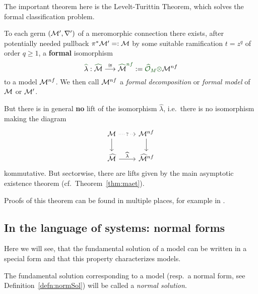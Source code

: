 The important theorem here is the Levelt-Turittin Theorem, which solves the
formal classification problem.
\begin{thm}\label{thm:leveltTurittin}
  To each germ $(\mathcal{M}',\nabla')$ of a meromorphic connection there exists, after
  potentially needed pullback $\pi^{*}\textcolor{black}{\mathcal{M}'}=:\mathcal{M}$ by some
  suitable ramification $t=z^q$ of order $q\geq1$, a
  \textcolor{green!30!black}{\textbf{formal}} isomorphism
  \[
    \textcolor{green!30!black}{\hat{\textcolor{black}{\lambda}}}:
    \textcolor{green!30!black}{\hat{\textcolor{black}{\cM}}}
    \overset{\cong}\longrightarrow
    \textcolor{green!30!black}{\hat{\textcolor{black}{\cM}}^{nf}}
    :=\textcolor{green!30!black}{\hat\cO_M\otimes}\cM^{nf}
  \]
  to a model $\mathcal{M}^{nf}$.
  We then call $\mathcal{M}^{nf}$ a \emph{formal decomposition} or \emph{formal model}
  of $\mathcal{M}$ or $\mathcal{M}'$.
  \begin{rem}
    But there is in general \textbf{no} lift of the isomorphism $\hat\lambda$,
    i.e.\ there is no isomorphism making the diagram
    \[ \begin{tikzcd}
        \cM \dar \arrow[dotted]{r}[description]{?} & \cM^{nf} \dar
        \\\hat\cM \rar{\hat\lambda} & \hat\cM^{nf}
    \end{tikzcd} \]
    kommutative.
    But sectorwise, there are lifts given by the main asymptotic existence
    theorem (cf.\ Theorem~\ref{thm:maet}).
  \end{rem}
\end{thm}
Proofs of this theorem can be found in multiple places, for example in
\cite[Thm.5.4.7]{sabbah_cimpa90}.


\subsection{In the language of systems: normal forms}\label{sec:normalForms}
Here we will see, that the fundamental solution of a model can be written in a
special form and that this property characterizes models.
\begin{defn}
  The fundamental solution corresponding to a model (resp.\ a normal form, see
  Definition~\ref{defn:normSol}) will be called a
  \emph{normal solution}.
\end{defn}

